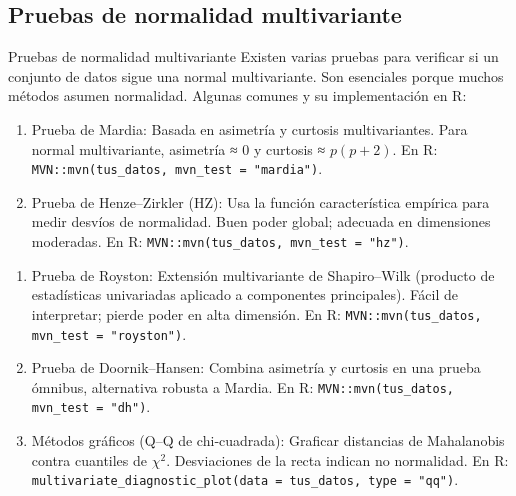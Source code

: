 \documentclass[
  11pt,
  ignorenonframetext,
  aspectratio=169]{beamer}
\theoremstyle{plain}
\theoremstyle{definition}
\theoremstyle{remark}
\newcounter{saveenumi}
\newcommand{\seti}{\setcounter{saveenumi}{\value{enumi}}}
\newcommand{\conti}{\setcounter{enumi}{\value{saveenumi}}}
\begin{document}
\subsection{Pruebas de normalidad
multivariante}\label{pruebas-de-normalidad-multivariante}

\begin{frame}{Pruebas de normalidad multivariante}
\label{pruebas-de-normalidad-multivariante-1}
Existen varias pruebas para verificar si un conjunto de datos sigue una
normal multivariante. Son esenciales porque muchos métodos asumen
normalidad. Algunas comunes y su implementación en R:

\begin{enumerate}
  \item \alert{Prueba de Mardia:}  
    Basada en asimetría y curtosis multivariantes.  
    Para normal multivariante, asimetría ≈ 0 y curtosis ≈ \(p(p+2)\). En R: \texttt{MVN::mvn(tus\_datos, mvn\_test = "mardia")}.
    
  \item \alert{Prueba de Henze–Zirkler (HZ):}  
    Usa la función característica empírica para medir desvíos de normalidad. Buen poder global; adecuada en dimensiones moderadas. En R: \texttt{MVN::mvn(tus\_datos, mvn\_test = "hz")}.
    
\seti 
\end{enumerate}
\end{frame}

\begin{frame}{}
\label{section-16}
\begin{enumerate} 

\conti

  \item \alert{Prueba de Royston:}  
    Extensión multivariante de Shapiro–Wilk (producto de estadísticas univariadas aplicado a componentes principales). Fácil de interpretar; pierde poder en alta dimensión. En R: \texttt{MVN::mvn(tus\_datos, mvn\_test = "royston")}.
    
  \item \alert{Prueba de Doornik–Hansen:}  
    Combina asimetría y curtosis en una prueba ómnibus, alternativa robusta a Mardia. En R: \texttt{MVN::mvn(tus\_datos, mvn\_test = "dh")}.
    
  \item \alert{Métodos gráficos (Q–Q de chi‑cuadrada):}  
    Graficar distancias de Mahalanobis contra cuantiles de $\chi^2$. Desviaciones de la recta indican no normalidad. En R: \texttt{multivariate\_diagnostic\_plot(data = tus\_datos, type = "qq")}.
\end{enumerate}
\end{frame}
\end{document}
